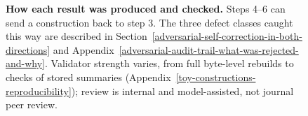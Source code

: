 \begin{figure}[tbp]
\caption{\textbf{How each result was produced and checked.} Steps 4--6 can send a construction back to step 3. The
three defect classes caught this way are described in Section~\ref{adversarial-self-correction-in-both-directions} and
Appendix~\ref{adversarial-audit-trail-what-was-rejected-and-why}. Validator strength varies, from full byte-level
rebuilds to checks of stored summaries (Appendix~\ref{toy-constructions-reproducibility}); review is internal and
model-assisted, not journal peer review.}
\label{fig:pipeline}
\end{figure}
